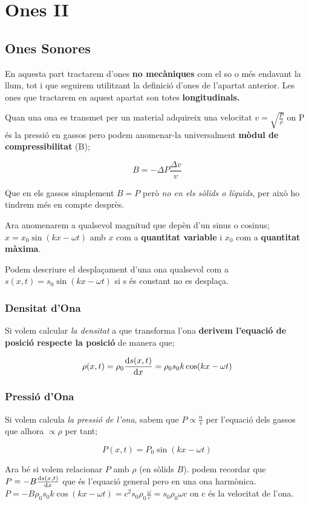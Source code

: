 \documentclass[12pt]{article}
\begin{document}
\section{Ones II}
\subsection{Ones Sonores}
En aquesta part tractarem d'ones \textbf{no mecàniques} com el so o més endavant la llum, tot i que seguirem utilitzant la definició d'ones de l'apartat anterior. Les ones que tractarem en aquest apartat son totes \textbf{longitudinals.}

Quan una ona es transmet per un material adquireix una velocitat $v = \sqrt{\frac{P}{\rho}}$ on P és la pressió en gassos pero podem anomenar-la universalment \textbf{mòdul de compressibilitat} (B);

\[\boxed{B = -\Delta P \frac{\Delta v}{v}}\]

Que en els gassos simplement $B = P$ però \textit{no en els sòlids o líquids}, per això ho tindrem més en compte desprès.

Ara anomenarem a qualsevol magnitud que depèn d'un sinus o cosinus; $\boxed{x = x_0 \sin(kx - \omega t)}$ amb $x$ com a \textbf{quantitat variable} i $x_0$ com a \textbf{quantitat màxima}.

Podem descriure el desplaçament d'una ona qualsevol com a $s(x,t) = s_0 \sin(kx - \omega t)$ si s és constant no es desplaça.

\subsubsection{Densitat d'Ona}

Si volem calcular \textit{la densitat} a que transforma l'ona \textbf{derivem l'equació de posició respecte la posició} de manera que;

\[\rho (x,t) = \rho_0 \dv{s(x,t)}{x} = \rho_0 s_0 k \cos(kx-\omega t)\]

\subsubsection{Pressió d'Ona}

Si volem calcula \textit{la pressió de l'ona}, sabem que $P \propto \frac{n}{v}$ per l'equació dels gassos que alhora $\propto \rho$ per tant;

\[P(x,t) = P_0\sin(kx - \omega t)\]

Ara bé si volem relacionar $P$ amb $\rho$ (en sòlids $B$). podem recordar que $P = -B \dv{s(x,t)}{x}$ que és l'equació general pero en una ona harmònica. $P = -B \rho_0 s_0 k \cos(kx-\omega t) = c^2 s_0 \rho_0 \frac{\omega}{c} = s_0 \rho_0 \omega c$ on c és la velocitat de l'ona.
\end{document}
